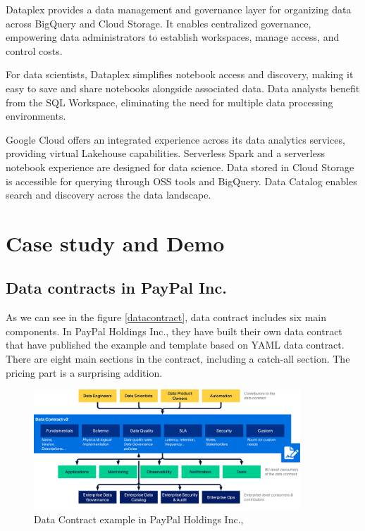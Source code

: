\documentclass[12pt, a4paper]{book}
\begin{document}
Dataplex provides a data management and governance layer for organizing data across BigQuery and Cloud Storage. It enables centralized governance, empowering data administrators to establish workspaces, manage access, and control costs.

For data scientists, Dataplex simplifies notebook access and discovery, making it easy to save and share notebooks alongside associated data. Data analysts benefit from the SQL Workspace, eliminating the need for multiple data processing environments.

Google Cloud offers an integrated experience across its data analytics services, providing virtual Lakehouse capabilities. Serverless Spark and a serverless notebook experience are designed for data science. Data stored in Cloud Storage is accessible for querying through OSS tools and BigQuery. Data Catalog enables search and discovery across the data landscape.

\section{Case study and Demo}
\subsection{Data contracts in PayPal Inc.}
As we can see in the figure \ref{datacontract}, data contract includes six main components. In PayPal Holdings Inc., they have built their own data contract that have published the example and template based on YAML data contract. There are eight main sections in the contract, including a catch-all section. The pricing part is a surprising addition.

\begin{figure}[h]
	\begin{framed}
		\centering
		\includegraphics[width=10cm]{datacontractPayPal.png}
		\caption{Data Contract example in PayPal Holdings Inc.,}
		\label{DataContractPayPal}
	\end{framed}
\end{figure}
\end{document}
